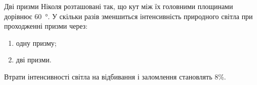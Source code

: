 %
%
^^I^^IДві призми Ніколя розташовані так, що кут між їх головними площинами дорівнює \SI{60}{\degree}. У скільки разів зменшиться інтенсивність природного світла при проходженні призми через:
^^I^^I\begin{enumerate}
^^I^^I^^I\item одну призму;
^^I^^I^^I\item дві призми.
^^I^^I\end{enumerate}
^^I^^IВтрати інтенсивності світла на відбивання і заломлення становлять 8\%.
